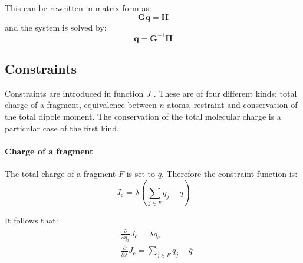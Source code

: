 \documentclass[a4paper]{report}
\newcommand{\bs}{\boldsymbol}
\newcommand{\mr}{\mathrm}
\begin{document}
This can be rewritten in matrix form as:
\begin{equation}
\bs{G} \bs{q} = \bs{H}
\end{equation}
and the system is solved by:
\begin{equation}
\bs{q} = \bs{G}^{-1} \bs{H}
\end{equation}

\subsection*{Constraints}

Constraints are introduced in function $J_\mr{c}$. These are of four different kinds:
total charge of a fragment, equivalence between $n$ atoms, restraint and conservation of the total dipole moment. The conservation of the total molecular charge is a particular
case of the first kind.

\paragraph{Charge of a fragment}

The total charge of a fragment $F$ is set to $\overline{q}$. Therefore the constraint
function is:
\begin{equation}
J_\mr{c} = \lambda\left(\sum_{j\in F} q_j - \overline{q} \right) 
\end{equation}

It follows that:
\begin{align}
&\frac{\partial}{\partial q_x} J_\mr{c} = \lambda q_x \\
&\frac{\partial}{\partial \lambda} J_\mr{c} = \sum_{j\in F} q_j - \overline{q}
\end{align}
\end{document}
